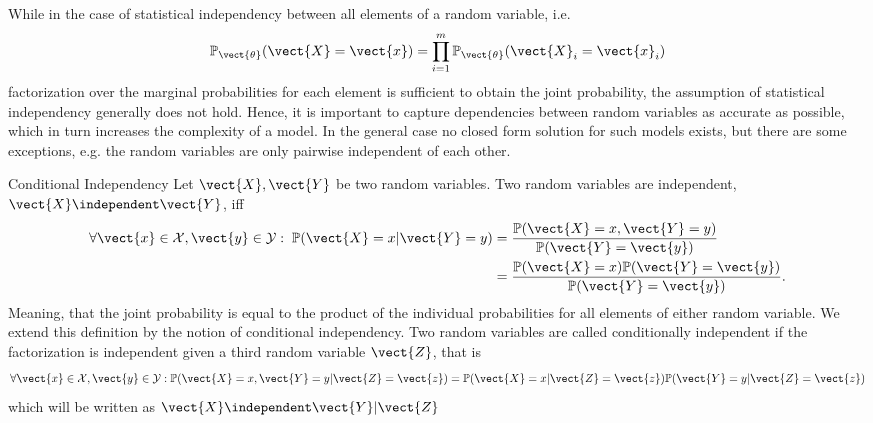 While in the case of statistical independency between all elements of a random variable, i.e.
\begin{equation}
    \mathbb{P}_{\vect{\theta}}(\vect{X} = \vect{x}) = \prod_{i=1}^m \mathbb{P}_{\vect{\theta}}(\vect{X}_i = \vect{x}_i)
\end{equation}
factorization over the marginal probabilities for each element is sufficient to obtain the joint probability, the assumption of statistical independency generally does not hold.
Hence, it is important to capture dependencies between random variables as accurate as possible, which in turn increases the complexity of a model.
In the general case no closed form solution for such models exists, but there are some exceptions, e.g. the random variables are only pairwise independent of each other.

\begin{definition}{Conditional Independency}
    Let $\vect{X}, \vect{Y}$ be two random variables. Two random variables are independent,  $\vect{X} \independent \vect{Y}$, iff
    \begin{equation}
        \begin{split}
        \forall \vect{x} \in \mathcal{X}, \vect{y} \in \mathcal{Y}:  \; \mathbb{P}(\vect{X} = x \lvert \vect{Y} = y) &= \frac{\mathbb{P}(\vect{X} = x , \vect{Y} = y)}{\mathbb{P}(\vect{Y} = \vect{y})} \\
        &=  \frac{\mathbb{P}(\vect{X} = x) \mathbb{P}(\vect{Y} = \vect{y})}{\mathbb{P}(\vect{Y} = \vect{y})}.  \\
        \end{split}
    \end{equation} 
    Meaning, that the joint probability is equal to the product of the individual probabilities for all elements of either random variable.
    We extend this definition by the notion of conditional independency. 
    Two random variables are called conditionally independent if the factorization is independent given a third random variable $\vect{Z}$, that is
    \begin{equation}
        \forall \vect{x} \in \mathcal{X}, \vect{y} \in \mathcal{Y}: \mathbb{P}(\vect{X} = x , \vect{Y} = y \lvert \vect{Z} = \vect{z}) =   \mathbb{P}(\vect{X} = x \lvert \vect{Z} = \vect{z}) \mathbb{P}(\vect{Y} = y \lvert \vect{Z} = \vect{z})
    \end{equation}
    which will be written as $\vect{X} \independent \vect{Y} \lvert \vect{Z} $
\end{definition}

